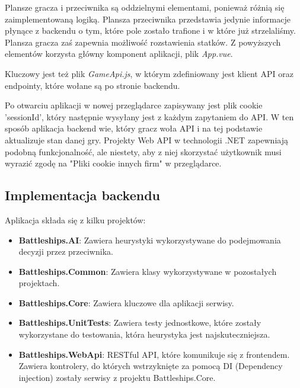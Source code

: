 Plansze gracza i przeciwnika są oddzielnymi elementami, ponieważ różnią się zaimplementowaną logiką. Plansza przeciwnika przedstawia jedynie informacje płynące z backendu o tym, które pole zostało trafione i w które już strzelaliśmy. Plansza gracza zaś zapewnia możliwość rozstawienia statków. Z powyższych elementów korzysta główny komponent aplikacji, plik \emph{App.vue}.

Kluczowy jest też plik \emph{GameApi.js}, w którym zdefiniowany jest klient API oraz endpointy, które wołane są po stronie backendu.

Po otwarciu aplikacji w nowej przeglądarce zapisywany jest plik cookie 'sessionId', który następnie wysyłany jest z każdym zapytaniem do API. W ten sposób aplikacja backend wie, który gracz woła API i na tej podstawie aktualizuje stan danej gry. Projekty Web API w technologii .NET zapewniają podobną funkcjonalność, ale niestety, aby z niej skorzystać użytkownik musi wyrazić zgodę na "Pliki cookie innych firm" w przeglądarce. 

\subsection{Implementacja backendu}
\indent Aplikacja składa się z kilku projektów:
\begin{itemize}
    \item \textbf{Battleships.AI}: Zawiera heurystyki wykorzystywane do podejmowania decyzji przez przeciwnika.
    \item \textbf{Battleships.Common}: Zawiera klasy wykorzystywane w pozostałych projektach.
    \item \textbf{Battleships.Core}: Zawiera kluczowe dla aplikacji serwisy.
    \item \textbf{Battleships.UnitTests}: Zawiera testy jednostkowe, które zostały wykorzystane do testowania, która heurystyka jest najskuteczniejsza.
    \item \textbf{Battleships.WebApi}: RESTful API, które komunikuje się z frontendem. Zawiera kontrolery, do których wstrzyknięte za pomocą DI (Dependency injection) zostały serwisy z projektu Battleships.Core.
\end{itemize}

